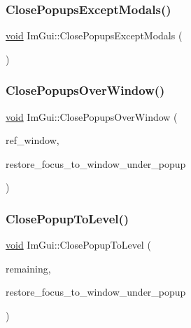 \subsubsection{\texorpdfstring{Close\+Popups\+Except\+Modals()}{ClosePopupsExceptModals()}}
{\footnotesize\ttfamily \hyperlink{imgui__impl__opengl3__loader_8h_ac668e7cffd9e2e9cfee428b9b2f34fa7}{void} Im\+Gui\+::\+Close\+Popups\+Except\+Modals (\begin{DoxyParamCaption}{ }\end{DoxyParamCaption})}

\mbox{\label{namespaceImGui_a0076b153c697cb85e263fcbd59340bce}} 
\subsubsection{\texorpdfstring{Close\+Popups\+Over\+Window()}{ClosePopupsOverWindow()}}
{\footnotesize\ttfamily \hyperlink{imgui__impl__opengl3__loader_8h_ac668e7cffd9e2e9cfee428b9b2f34fa7}{void} Im\+Gui\+::\+Close\+Popups\+Over\+Window (\begin{DoxyParamCaption}\item[{\hyperlink{structImGuiWindow}{Im\+Gui\+Window} $\ast$}]{ref\+\_\+window,  }\item[{bool}]{restore\+\_\+focus\+\_\+to\+\_\+window\+\_\+under\+\_\+popup }\end{DoxyParamCaption})}

\mbox{\label{namespaceImGui_a0be705dc533a62387dc39ec5c276d2a0}} 
\subsubsection{\texorpdfstring{Close\+Popup\+To\+Level()}{ClosePopupToLevel()}}
{\footnotesize\ttfamily \hyperlink{imgui__impl__opengl3__loader_8h_ac668e7cffd9e2e9cfee428b9b2f34fa7}{void} Im\+Gui\+::\+Close\+Popup\+To\+Level (\begin{DoxyParamCaption}\item[{int}]{remaining,  }\item[{bool}]{restore\+\_\+focus\+\_\+to\+\_\+window\+\_\+under\+\_\+popup }\end{DoxyParamCaption})}

